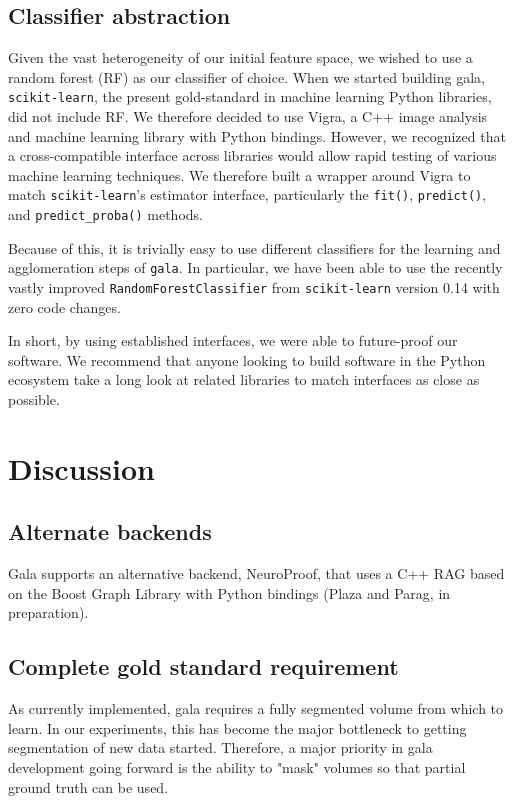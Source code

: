 \documentclass{frontiersSCNS} %
\begin{document}
\subsection{Classifier abstraction}

Given the vast heterogeneity of our initial feature space, we wished to use a random forest (RF) as our classifier of choice.
When we started building gala, \texttt{scikit-learn}, the present gold-standard in machine learning Python libraries, did not include RF.
We therefore decided to use Vigra, a C++ image analysis and machine learning library with Python bindings.
However, we recognized that a cross-compatible interface across libraries would allow rapid testing of various machine learning techniques.
We therefore built a wrapper around Vigra to match \texttt{scikit-learn}'s estimator interface, particularly the \texttt{fit()}, \texttt{predict()}, and \texttt{predict\_proba()} methods.

Because of this, it is trivially easy to use different classifiers for the learning and agglomeration steps of \texttt{gala}.
In particular, we have been able to use the recently vastly improved \texttt{RandomForestClassifier} from \texttt{scikit-learn} version 0.14 with zero code changes.

In short, by using established interfaces, we were able to future-proof our software.
We recommend that anyone looking to build software in the Python ecosystem take a long look at related libraries to match interfaces as close as possible.


\section{Discussion}


\subsection{Alternate backends}

Gala supports an alternative backend, NeuroProof, that uses a C++ RAG based on the Boost Graph Library with Python bindings (Plaza and Parag, in preparation).

\subsection{Complete gold standard requirement}

As currently implemented, gala requires a fully segmented volume from which to learn.
In our experiments, this has become the major bottleneck to getting segmentation of new data started.
Therefore, a major priority in gala development going forward is the ability to "mask" volumes so that partial ground truth can be used.
\end{document}
